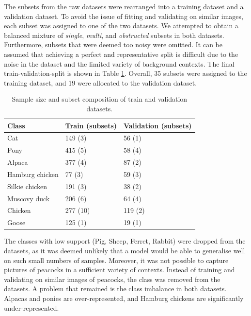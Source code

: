 \documentclass{l4proj}
\begin{document}
The subsets from the raw datasets were rearranged into a training dataset and a validation dataset. To avoid the issue of fitting and validating on similar images, each subset was assigned to one of the two datasets. We attempted to obtain a balanced mixture of \textit{single}, \textit{multi}, and \textit{obstructed} subsets in both datasets. Furthermore, subsets that were deemed too noisy were omitted. It can be assumed that achieving a perfect and representative split is difficult due to the noise in the dataset and the limited variety of background contexts. The final train-validation-split is shown in Table \ref{table:train_test_dataset}. Overall, 35 subsets were assigned to the training dataset, and 19 were allocated to the validation dataset.

\begin{table}[ht]
  \centering
  \begin{tabular}{@{}lll@{}}
    \toprule
    \textbf{Class}  & \textbf{Train (subsets)} & \textbf{Validation (subsets)} \\ \midrule
    Cat             & 149 (3)                  & 56  (1)        \\
    Pony            & 415 (5)                  & 58  (4)        \\
    Alpaca          & 377 (4)                  & 87  (2)        \\
    Hamburg chicken & 77  (3)                  & 59  (3)        \\
    Silkie chicken  & 191 (3)                  & 38  (2)        \\
    Muscovy duck    & 206 (6)                  & 64  (4)        \\
    Chicken         & 277 (10)                 & 119 (2)        \\
    Goose           & 125 (1)                  & 19  (1)        \\ \bottomrule
  \end{tabular}
  \vspace*{3mm}
  \caption{Sample size and subset composition of train and validation datasets.}
  \label{table:train_test_dataset}
  \vspace*{-3mm}
\end{table}

The classes with low support (Pig, Sheep, Ferret, Rabbit) were dropped from the datasets, as it was deemed unlikely that a model would be able to generalise well on such small numbers of samples. Moreover, it was not possible to capture pictures of peacocks in a sufficient variety of contexts. Instead of training and validating on similar images of peacocks, the class was removed from the datasets. A problem that remained is the class imbalance in both datasets. Alpacas and ponies are over-represented, and Hamburg chickens are significantly under-represented.
\end{document}
